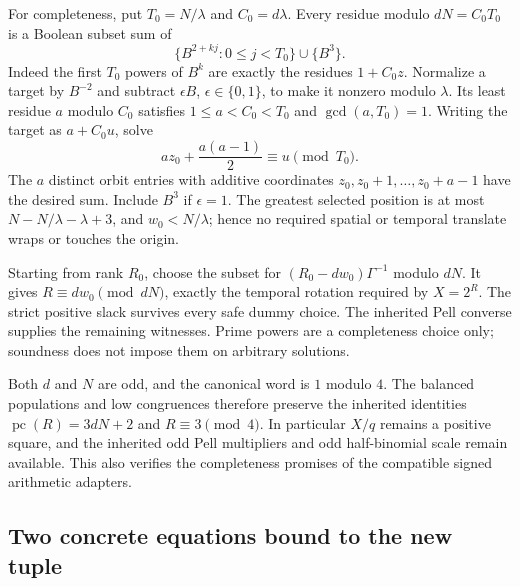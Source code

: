 For completeness, put $T_0=N/\lambda$ and $C_0=d\lambda$.
Every residue modulo $dN=C_0T_0$ is a Boolean subset sum of
\[
 \{B^{2+kj}:0\le j<T_0\}\cup\{B^3\}.
\]
Indeed the first $T_0$ powers of $B^k$ are exactly the residues
$1+C_0z$.  Normalize a target by $B^{-2}$ and subtract
$\epsilon B$, $\epsilon\in\{0,1\}$, to make it nonzero modulo
$\lambda$.  Its least residue $a$ modulo $C_0$ satisfies
$1\le a<C_0<T_0$ and $\gcd(a,T_0)=1$.  Writing the target as
$a+C_0u$, solve
\[
 az_0+\frac{a(a-1)}2\equiv u\pmod{T_0}.
\]
The $a$ distinct orbit entries with additive coordinates
$z_0,z_0+1,\ldots,z_0+a-1$ have the desired sum.  Include $B^3$
if $\epsilon=1$.  The greatest selected position is at most
$N-N/\lambda-\lambda+3$, and $w_0<N/\lambda$; hence no required
spatial or temporal translate wraps or touches the origin.

Starting from rank $R_0$, choose the subset for
$(R_0-dw_0)\Gamma^{-1}$ modulo $dN$.  It gives
$R\equiv dw_0\pmod{dN}$, exactly the temporal rotation required by
$X=2^R$.  The strict positive slack survives every safe dummy choice.
The inherited Pell converse supplies the remaining witnesses.  Prime
powers are a completeness choice only; soundness does not impose them
on arbitrary solutions.

Both $d$ and $N$ are odd, and the canonical word is $1$ modulo $4$.
The balanced populations and low congruences therefore preserve the
inherited identities $\operatorname{pc}(R)=3dN+2$ and $R\equiv3\pmod4$.
In particular $X/q$ remains a positive square, and the inherited odd
Pell multipliers and odd half-binomial scale remain available.  This
also verifies the completeness promises of the compatible signed
arithmetic adapters.

\subsection{Two concrete equations bound to the new tuple}

